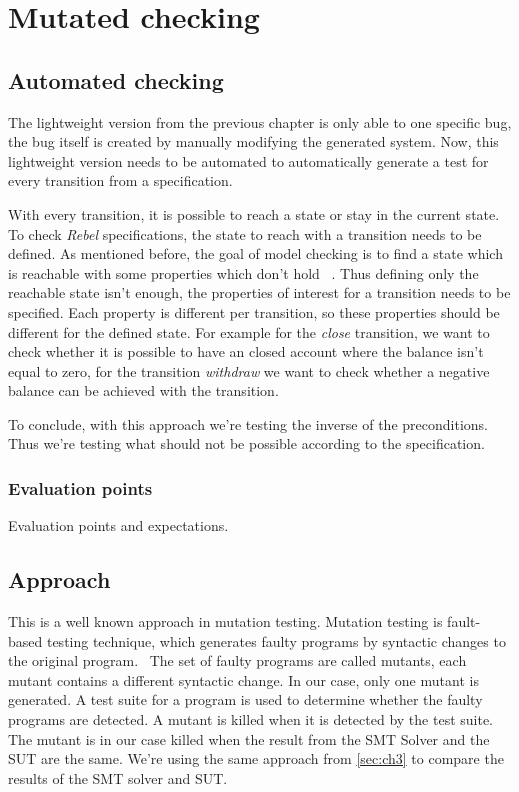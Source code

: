\chapter{Mutated checking}\label{sec:ch4}


\section{Automated checking}

The lightweight version from the previous chapter is only able to one specific
bug, the bug itself is created by manually modifying the generated system. Now,
this lightweight version needs to be automated to automatically generate a test
for every transition from a specification.

With every transition, it is possible to reach a state or stay in the current
state. To check \textit{Rebel} specifications, the state to reach with a transition needs
to be defined. As mentioned before, the goal of model checking is to find a
state which is reachable with some properties which don't hold
~\cite[p.5]{stoel_storm_vinju_bosman_2016}. Thus defining only the reachable
state isn't enough, the properties of interest for a transition needs to be
specified. Each property is different per transition, so these properties should
be different for the defined state. For example for the \textit{close}
transition, we want to check whether it is possible to have an closed account
where the balance isn't equal to zero, for the transition \textit{withdraw} we
want to check whether a negative balance can be achieved with the transition.

To conclude, with this approach we're testing the inverse of the preconditions. Thus we're testing
what should not be possible according to the specification.

\subsection{Evaluation points}
Evaluation points and expectations.

\section{Approach}
This is a well known approach in mutation testing. Mutation testing is
fault-based testing technique, which generates faulty programs by syntactic
changes to the original program.~\cite[p.~1]{jia2011analysis} The set of faulty
programs are called mutants, each mutant contains a different syntactic change.
In our case, only one mutant is generated. A test suite for a program is used to
determine whether the faulty programs are detected. A mutant is killed when it
is detected by the test suite. The mutant is in our case killed when the result
from the SMT Solver and the SUT are the same. We're using the same
approach from \autoref{sec:ch3} to compare the results of the SMT solver and
SUT.

